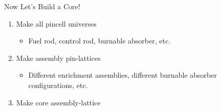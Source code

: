 \begin{frame}[fragile]{Now Let's Build a Core!}

  \begin{enumerate}
    \item<1-> Make all pincell universes
    \begin{itemize}
      \item<1-> Fuel rod, control rod, burnable absorber, etc.
    \end{itemize}
    \item<2-> Make assembly pin-lattices
    \begin{itemize}
      \item<2-> Different enrichment assemblies, different burnable absorber configurations, etc.
    \end{itemize}
    \item<3-> Make core assembly-lattice
  \end{enumerate}

  \centering
  
  \vspace{0.2cm}
  
  \centering
\end{frame}
